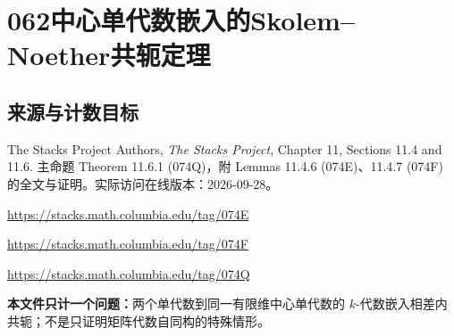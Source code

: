 \documentclass[UTF8,11pt]{ctexart}
\theoremstyle{definition}
\begin{document}
\section*{062\quad 中心单代数嵌入的Skolem--Noether共轭定理}
\subsection*{来源与计数目标}
The Stacks Project Authors, \emph{The Stacks Project}, Chapter 11, Sections 11.4 and 11.6. 主命题 Theorem 11.6.1 (074Q)，附 Lemmas 11.4.6 (074E)、11.4.7 (074F) 的全文与证明。实际访问在线版本：2026-09-28。\par\url{https://stacks.math.columbia.edu/tag/074E}\par\url{https://stacks.math.columbia.edu/tag/074F}
\par\url{https://stacks.math.columbia.edu/tag/074Q}
\par\textbf{本文件只计一个问题：}两个单代数到同一有限维中心单代数的 $k$-代数嵌入相差内共轭；不是只证明矩阵代数自同构的特殊情形。
\end{document}
